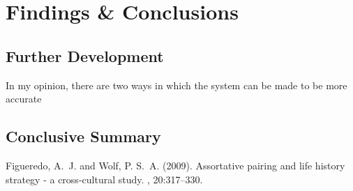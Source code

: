 \documentclass[12pt]{article} %
\begin{document}
\section{Findings & Conclusions}
\subsection{Further Development}
In my opinion, there are two ways in which the system can be made to be more accurate
\subsection{Conclusive Summary}


\begin{thebibliography}{99} %

Figueredo, A.~J. and Wolf, P. S.~A. (2009).
\newblock Assortative pairing and life history strategy - a cross-cultural
  study.
, 20:317--330.
 
\end{thebibliography}

\appendix
\end{document}
